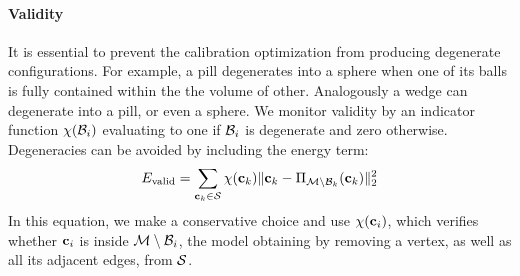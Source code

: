 \paragraph{Validity}
It is essential to prevent the calibration optimization from producing degenerate configurations. For example, a pill degenerates into a sphere when one of its balls is fully contained within the the volume of other. Analogously a wedge can degenerate into a pill, or even a sphere. We monitor validity by an indicator function $\chi(\mathcal{B}_i)$ evaluating to one if $\mathcal{B}_i$ is degenerate and zero otherwise.
Degeneracies can be avoided by including the energy term:
% 
\begin{equation}
E_{\text{valid}} = \sum_{\mathbf{c}_k \in \mathcal{S}} \chi(\mathbf{c}_k) \| \mathbf{c}_k - \Pi_{\mathcal{M} \setminus \mathcal{B}_k}(\mathbf{c}_k) \|_2^2
\end{equation}
% 
In this equation, we make a conservative choice and use $\chi(\mathbf{c}_i)$, which verifies whether $\mathbf{c}_i$ is inside $\mathcal{M} \setminus \mathcal{B}_i$, the model obtaining by removing a vertex, as well as all its adjacent edges, from $\mathcal{S}$. 

\endinput

\paragraph{Rigidity - OLD}
\begin{DRAFT}
We encode this requirement by requiring each edge $\edge_k$ in each posed skeleton $\skeleton_n$ to be a rotation of rotation $R_{k}$ of its rest-pose configuration~$\bar\edge_k$: 
\begin{equation}
E_{\text{rigid}} = \sum_{\edge_k \in \skeleton_n} \| \edge_k  - R_{k}{\bar\edge_k} \|_2^2
\label{eq:rigidity}
\end{equation} 
Note that only a subset of the edges of our control skeleton, as illustrated in \Figure{topology}, are required to satisfy this rigidity requirement. At the cost of introducing auxiliary variables $R_{i}$, this energy becomes independent from pose $\parposes$ and posture $\parposture$ angles.
\end{DRAFT}


